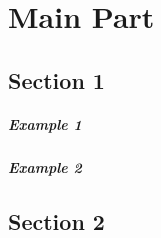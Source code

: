 \chapter{Main Part}
\label{ch:mainpart}
\glsresetall
\lipsum[1]
\section{Section 1}

\paragraph{Example 1} \lipsum[2]
\paragraph{Example 2} \lipsum[2]

\bigskip %

\lipsum[3]

\section{Section 2}
